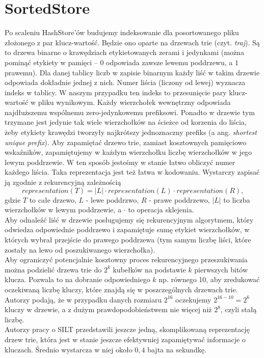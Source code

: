 \documentclass[declaration,shortabstract,masc]{iithesis}
\begin{document}
		\section{SortedStore}
			Po scaleniu HashStore'ów budujemy indeksowanie dla posortowanego pliku złożonego z par klucz-wartość. Będzie ono oparte na drzewach trie (czyt. \textit{traj}). Są to drzewa binarne o krawędziach etykietowanych zerami i jedynkami (można pominąć etykiety w pamięci -- $0$ odpowiada zawsze lewemu poddrzewu, a $1$ prawemu). Dla danej tablicy liczb w zapisie binarnym każdy liść w takim drzewie odpowiada dokładnie jednej z nich. Numer liścia (liczony od lewej) wyznacza indeks w tablicy. W naszym przypadku ten indeks to przesunięcie pary klucz-wartość w pliku wynikowym. Każdy wierzchołek wewnętrzny odpowiada najdłuższemu wspólnemu zero-jedynkowemu prefiksowi. Ponadto w drzewie tym trzymane jest jedynie tak wiele wierzchołków na ścieżce od korzenia do liścia, żeby etykiety krawędzi tworzyły najkrótszy jednoznaczny prefiks (a ang. \textit{shortest unique prefix}). Aby zapamiętać drzewo trie, zamiast kosztownych pamięciowo wskaźników, zapamiętujemy w każdym wierzchołku liczbę wierzchołków w jego lewym poddrzewie. W ten sposób jesteśmy w stanie łatwo obliczyć numer każdego liścia. Taka reprezentacja jest też łatwa w kodowaniu. Wystarczy zapisać ją zgodnie z rekurencyjną zależnością
			$$representation\left(T\right) = |L| \cdot representation\left(L\right) \cdot representation\left(R\right),$$
			gdzie $T$ to całe drzewo, $L$ - lewe poddrzwo, $R$ - prawe poddrzewo, $|L|$ to liczba wierzchołków w lewym poddrzewie, a $\cdot$ to operacja sklejenia.\\
			\indent Aby odnaleźć liść w drzewie posługujemy się rekurencyjnym algorytmem, który odwiedza odpowiednie poddrzewo i zapamiętuje sumę etykiet wierzchołków, w których wybrał przejście do prawego poddrzewa (tym samym liczbę liści, które zostały na lewo od poszukiwanego wierzchołka).\\
			\indent Aby ograniczyć potencjalnie kosztowny proces rekurencyjnego przeszukiwania można podzielić drzewa trie do $2^k$ kubełków na podstawie $k$ pierwszych bitów klucza. Pozwala to na dobranie odpowiedniego $k$ np. równego 10, aby zredukować oczekiwaną liczbę kluczy, które znajdą się w poszczególnych drzewach trie. Autorzy podają, że w przypadku danych rozmiaru $2^{16}$ oczekujemy $2^{16-10} = 2^6$ kluczy w drzewie, a z dużym prawdopodobieństwem nie więcej niż $2^8$, czyli stałą liczbę.\\
			\indent Autorzy pracy o SILT przedstawili jeszcze jedną, skomplikowaną reprezentację drzew trie, która jest w stanie jeszcze efektywniej zapamiętywać informacje o kluczach. Średnio wystarcza w niej około $0,4$ bajta na sekundkę.
\end{document}
